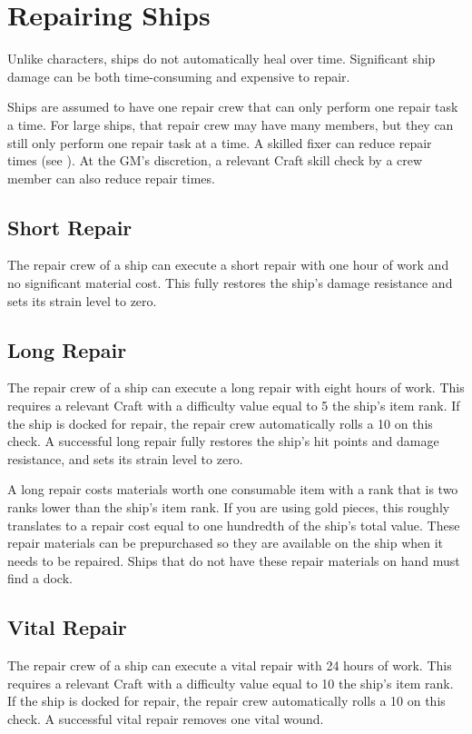\section{Repairing Ships}
  Unlike characters, ships do not automatically heal over time.
  Significant ship damage can be both time-consuming and expensive to repair.

  Ships are assumed to have one repair crew that can only perform one repair task a time.
  For large ships, that repair crew may have many members, but they can still only perform one repair task at a time.
  A skilled fixer can reduce repair times (see ).
  At the GM's discretion, a relevant Craft skill check by a crew member can also reduce repair times.

  \subsection{Short Repair}
    The repair crew of a ship can execute a short repair with one hour of work and no significant material cost.
    This fully restores the ship's damage resistance and sets its strain level to zero.

  \subsection{Long Repair}
    The repair crew of a ship can execute a long repair with eight hours of work.
    This requires a relevant Craft  with a difficulty value equal to 5 \add the ship's item rank.
    If the ship is docked for repair, the repair crew automatically rolls a 10 on this check.
    A successful long repair fully restores the ship's hit points and damage resistance, and sets its strain level to zero.

    A long repair costs materials worth one consumable item with a rank that is two ranks lower than the ship's item rank.
    If you are using gold pieces, this roughly translates to a repair cost equal to one hundredth of the ship's total value.
    These repair materials can be prepurchased so they are available on the ship when it needs to be repaired.
    Ships that do not have these repair materials on hand must find a dock.

  \subsection{Vital Repair}
    The repair crew of a ship can execute a vital repair with 24 hours of work.
    This requires a relevant Craft  with a difficulty value equal to 10 \add the ship's item rank.
    If the ship is docked for repair, the repair crew automatically rolls a 10 on this check.
    A successful vital repair removes one vital wound.

